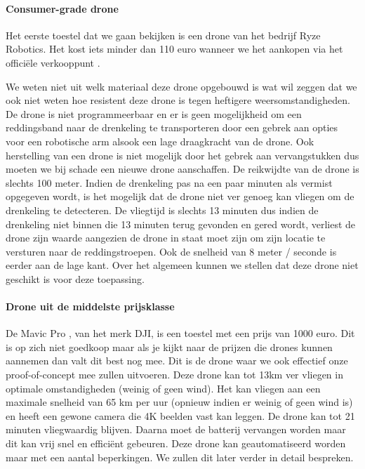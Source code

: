 \paragraph{Consumer-grade drone}

Het eerste toestel dat we gaan bekijken is een drone van het bedrijf Ryze Robotics. \autocite{CheapDrone} Het kost iets minder dan 110 euro wanneer we het aankopen via het officiële verkooppunt \autocite{CheapDroneOfficial}. 

We weten niet uit welk materiaal deze drone opgebouwd is wat wil zeggen dat we ook niet weten hoe resistent deze drone is tegen heftigere weersomstandigheden. De drone is niet programmeerbaar en er is geen mogelijkheid om een reddingsband naar de drenkeling te transporteren door een gebrek aan opties voor een robotische arm alsook een lage draagkracht van de drone. Ook herstelling van een drone is niet mogelijk door het gebrek aan vervangstukken dus moeten we bij schade een nieuwe drone aanschaffen. De reikwijdte van de drone is slechts 100 meter. Indien de drenkeling pas na een paar minuten als vermist opgegeven wordt, is het mogelijk dat de drone niet ver genoeg kan vliegen om de drenkeling te detecteren. De vliegtijd is slechts 13 minuten dus indien de drenkeling niet binnen die 13 minuten terug gevonden en gered wordt, verliest de drone zijn waarde aangezien de drone  in staat moet zijn om zijn locatie te versturen naar de reddingstroepen. Ook de snelheid van 8 meter / seconde is eerder aan de lage kant.
Over het algemeen kunnen we stellen dat deze drone niet geschikt is voor deze toepassing.

\paragraph{Drone uit de middelste prijsklasse}

De Mavic Pro \autocite{MavicPro}, van het merk DJI, is een toestel met een prijs van 1000 euro. Dit is op zich niet goedkoop maar als je kijkt naar de prijzen die drones kunnen aannemen dan valt dit best nog mee. Dit is de drone waar we ook effectief onze proof-of-concept mee zullen uitvoeren. Deze drone kan tot 13km ver vliegen in optimale omstandigheden (weinig of geen wind). Het kan vliegen aan een maximale snelheid van 65 km per uur (opnieuw indien er weinig of geen wind is) en heeft een gewone camera die 4K beelden vast kan leggen. De drone kan tot 21 minuten vliegwaardig blijven. Daarna moet de batterij vervangen worden maar dit kan vrij snel en efficiënt gebeuren. Deze drone kan geautomatiseerd worden maar met een aantal beperkingen. We zullen dit later verder in detail bespreken.

